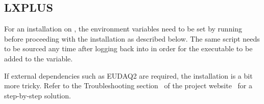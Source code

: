 \subsection{LXPLUS}
For an installation on , the environment variables need to be set by running  before proceeding with the installation as described below.
The same script needs to be sourced any time after logging back into  in order for the  executable to be added to the  variable.

If external dependencies such as EUDAQ2 are required, the installation is a bit more tricky.
Refer to the Troubleshooting section~\cite{corry-website-troubleshooting} of the project website~\cite{corry-website} for a step-by-step solution.
